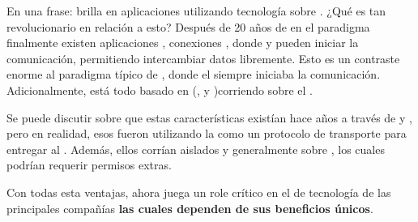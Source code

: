 En una frase: \nodejsNAME brilla en aplicaciones \webINT \realTimeINT utilizando tecnología \pushINT sobre \websocketsINT. ¿Qué es tan revolucionario en relación a esto? Después de 20 años de \statelessWebINT en el paradigma \requestResponseINT finalmente existen aplicaciones \webINT \realTimeINT, conexiones \twoWayINT, donde \clientAS y \serverAS pueden iniciar la comunicación, permitiendo intercambiar datos libremente. Esto es un contraste enorme al paradigma típico de \webResponseINT, donde el \clientAS siempre iniciaba la comunicación. Adicionalmente, está todo basado en \openWebStackINT (\htmlNAME, \cssNAME y \javaScriptNAME )corriendo sobre el .

Se puede discutir sobre que estas características existían hace años a través de \flashNAME y \javaAppletsINT, pero en realidad, esos fueron \sandboxedEnvPL utilizando la \webINT como un protocolo de transporte para entregar al \clientAS. Además, ellos corrían aislados y generalmente sobre \nonStandardPortsINT, los cuales podrían requerir permisos extras.

Con todas esta ventajas, \nodejsNAME ahora juega un role crítico en el \stackAS de tecnología de las principales compañías \highProfileCPT \cite{online_nodejs_highprofilecompanies} \textbf{las cuales dependen de sus beneficios únicos}.


